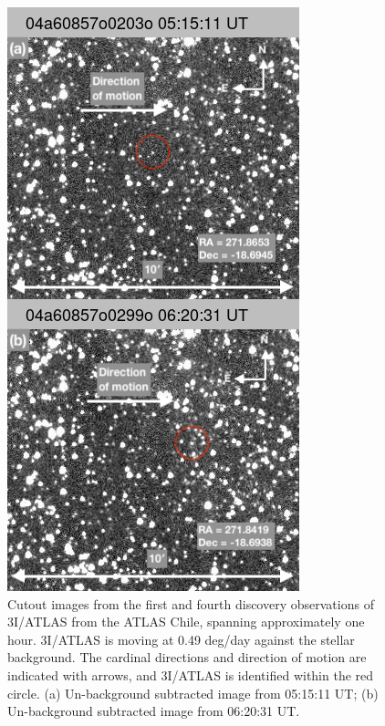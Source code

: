 \documentclass[twocolumn,longbib]{aastex7}
\begin{document}
\begin{CJK*}{UTF8}{gbsn}
\begin{figure}
    \centering
    \includegraphics[width=1.\linewidth]{static/3I_discovery_montage2.png}
    \caption{Cutout images from the first and fourth discovery observations of 3I/ATLAS from the ATLAS Chile, spanning approximately one hour. 3I/ATLAS is moving at 0.49 deg/day against the stellar background. The cardinal directions and direction of motion are indicated with arrows, and 3I/ATLAS is identified within the red circle. (a) Un-background subtracted image from 05:15:11 UT; (b) Un-background subtracted image from 06:20:31 UT. }
    \label{fig:discovery}
\end{figure}


\end{CJK*}
\end{document}
